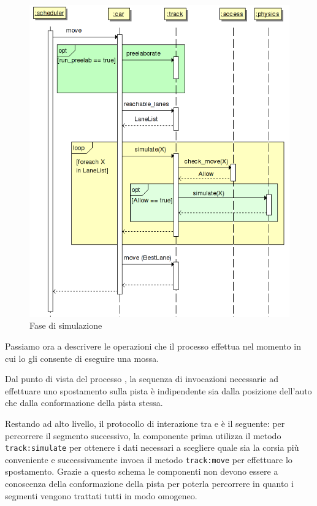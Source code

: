 \begin{figure}
\includegraphics[width=\textwidth]{diagrammi/Simulation}
\caption{Fase di simulazione}
\label{fig:simulation}
\end{figure}

Passiamo ora a descrivere le operazioni che il processo \car{} effettua nel momento in cui lo \sched{} gli consente di eseguire una mossa.

Dal punto di vista del processo \car{}, la sequenza di invocazioni necessarie ad effettuare uno spostamento sulla pista è indipendente sia dalla posizione dell'auto che dalla conformazione della pista stessa.

Restando ad alto livello, il protocollo di interazione tra \car{} e \track{} è il seguente: per percorrere il segmento successivo, la componente \car{} prima utilizza il metodo \texttt{track:simulate} per ottenere i dati necessari a scegliere quale sia la corsia più conveniente e successivamente invoca il metodo \texttt{track:move} per effettuare lo spostamento.
Grazie a questo schema le componenti \car{} non devono essere a conoscenza della conformazione della pista per poterla percorrere in quanto i segmenti vengono trattati tutti in modo omogeneo.

